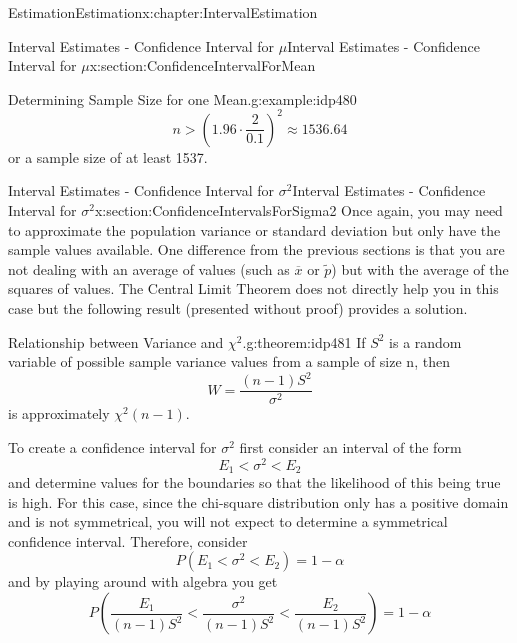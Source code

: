 \documentclass[oneside,10pt,]{book}
\numberwithin{equation}{section}
\newcommand{\lt}{<}
\newcommand{\gt}{>}
\begin{document}
\begin{chapterptx}{Estimation}{}{Estimation}{}{}{x:chapter:IntervalEstimation}
\begin{sectionptx}{Interval Estimates - Confidence Interval for \(\mu\)}{}{Interval Estimates - Confidence Interval for \(\mu\)}{}{}{x:section:ConfidenceIntervalForMean}
\begin{example}{Determining Sample Size for one Mean.}{g:example:idp480}
\begin{equation*}
n \gt \left ( 1.96 \cdot \frac{2}{0.1} \right )^2 \approx 1536.64
\end{equation*}
or a sample size of at least 1537.%
\end{example}
\end{sectionptx}
%
%
\typeout{************************************************}
\typeout{************************************************}
%
\begin{sectionptx}{Interval Estimates - Confidence Interval for \(\sigma^2\)}{}{Interval Estimates - Confidence Interval for \(\sigma^2\)}{}{}{x:section:ConfidenceIntervalsForSigma2}
Once again, you may need to approximate the population variance or standard deviation but only have the sample values available. One difference from the previous sections is that you are not dealing with an average of values (such as \(\overline{x}\) or \(\tilde{p}\)) but with the average of the squares of values. The Central Limit Theorem does not directly help you in this case but the following result (presented without proof) provides a solution.%
\begin{theorem}{Relationship between Variance and \(\chi ^2\).}{}{g:theorem:idp481}%
If \(S^2\) is a random variable of possible sample variance values from a sample of size n, then%
\begin{equation*}
W = \frac{(n-1)S^2}{\sigma^2}
\end{equation*}
is approximately \(\chi ^2(n-1).\)%
\end{theorem}
To create a confidence interval for \(\sigma^2\) first consider an interval of the form%
\begin{equation*}
E_1 \lt \sigma^2 \lt E_2
\end{equation*}
and determine values for the boundaries so that the likelihood of this being true is high. For this case, since the chi-square distribution only has a positive domain and is not symmetrical, you will not expect to determine a symmetrical confidence interval.  Therefore, consider%
\begin{equation*}
P (E_1 \lt \sigma^2 \lt E_2 ) = 1 - \alpha 
\end{equation*}
and by playing around with algebra you get%
\begin{equation*}
P \left ( \frac{E_1}{(n-1)S^2} \lt \frac{\sigma^2}{(n-1)S^2} \lt \frac{E_2}{(n-1)S^2} \right ) = 1 - \alpha 
\end{equation*}

\end{sectionptx}
\end{chapterptx}
\end{document}
